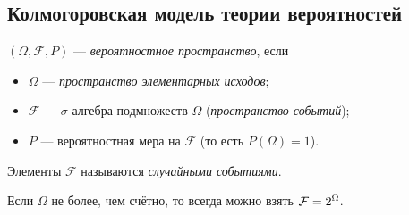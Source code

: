 \subsection{Колмогоровская модель теории вероятностей}

\begin{df}
 $(\Omega, \mathcal F, P)$ --- \textit{вероятностное пространство}, если
 \begin{itemize}
  \item $\Omega$ --- \textit{пространство элементарных исходов};
  \item $\mathcal F$ --- $\sigma$-алгебра подмножеств $\Omega$ (\textit{пространство событий});
  \item $P$ --- вероятностная мера на $\mathcal F$ (то есть $P(\Omega) = 1$).
 \end{itemize}

 Элементы $\mathcal F$ называются \textit{случайными событиями}.
\end{df}
\begin{remrk}
 Если $\Omega$ не более, чем счётно, то всегда можно взять $\mathcal F = 2^{\Omega}$.
\end{remrk}

